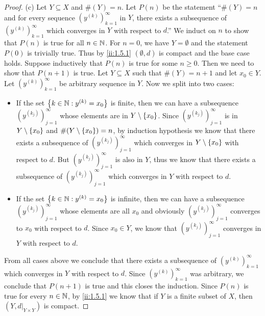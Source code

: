 \begin{proof}{(c)}
  Let \(Y \subseteq X\) and \(\#(Y) = n\).
  Let \(P(n)\) be the statement ``\(\#(Y) = n\) and for every sequence \((y^{(k)})_{k = 1}^\infty\) in \(Y\), there exists a subsequence of \((y^{(k)})_{k = 1}^\infty\) which converges in \(Y\) with respect to \(d\).''
  We induct on \(n\) to show that \(P(n)\) is true for all \(n \in \mathbb{N}\).
  For \(n = 0\), we have \(Y = \emptyset\) and the statement \(P(0)\) is trivially true.
  Thus by \cref{ii:1.5.1} \((\emptyset, d)\) is compact and the base case holds.
  Suppose inductively that \(P(n)\) is true for some \(n \geq 0\).
  Then we need to show that \(P(n + 1)\) is true.
  Let \(Y \subseteq X\) such that \(\#(Y) = n + 1\) and let \(x_0 \in Y\).
  Let \((y^{(k)})_{k = 1}^\infty\) be arbitrary sequence in \(Y\).
  Now we split into two cases:
  \begin{itemize}
    \item If the set \(\left\lbrace k \in \mathbb{N} : y^{(k)} = x_0\right\rbrace\) is finite, then we can have a subsequence \((y^{(k_j)})_{j = 1}^\infty\) whose elements are in \(Y \setminus \left\lbrace x_0\right\rbrace\).
          Since \((y^{(k_j)})_{j = 1}^\infty\) is in \(Y \setminus \left\lbrace x_0\right\rbrace\) and \(\#(Y \setminus \left\lbrace x_0\right\rbrace) = n\), by induction hypothesis we know that there exists a subsequence of \((y^{(k_j)})_{j = 1}^\infty\) which converges in \(Y \setminus \left\lbrace x_0\right\rbrace\) with respect to \(d\).
          But \((y^{(k_j)})_{j = 1}^\infty\) is also in \(Y\), thus we know that there exists a subsequence of \((y^{(k_j)})_{j = 1}^\infty\) which converges in \(Y\) with respect to \(d\).
    \item If the set \(\left\lbrace k \in \mathbb{N} : y^{(k)} = x_0\right\rbrace\) is infinite, then we can have a subsequence \((y^{(k_j)})_{j = 1}^\infty\) whose elements are all \(x_0\) and obviously \((y^{(k_j)})_{j = 1}^\infty\) converges to \(x_0\) with respect to \(d\).
          Since \(x_0 \in Y\), we know that \((y^{(k_j)})_{j = 1}^\infty\) converges in \(Y\) with respect to \(d\).
  \end{itemize}
  From all cases above we conclude that there exists a subsequence of \((y^{(k)})_{k = 1}^\infty\) which converges in \(Y\) with respect to \(d\).
  Since \((y^{(k)})_{k = 1}^\infty\) was arbitrary, we conclude that \(P(n + 1)\) is true and this closes the induction.
  Since \(P(n)\) is true for every \(n \in \mathbb{N}\), by \cref{ii:1.5.1} we know that if \(Y\) is a finite subset of \(X\), then \((Y, d|_{Y \times Y})\) is compact.
\end{proof}

\exercisesection

